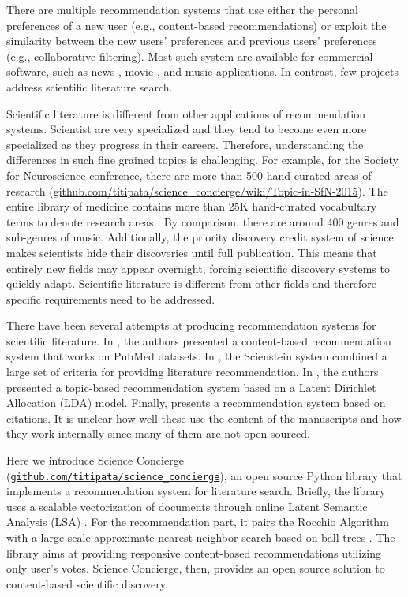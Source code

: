 \documentclass[a4paper]{article}
\begin{document}
There are multiple recommendation systems that use either the personal preferences of a new user (e.g., content-based recommendations) or exploit the similarity between the new users’ preferences and previous users’ preferences (e.g., collaborative filtering). Most such system are available for commercial software, such as news \cite{li2010contextual}, movie \cite{bell2007lessons}, and music \cite{Ali11parallelcollaborative} applications. In contrast, few projects address scientific literature search.

Scientific literature is different from other applications of recommendation systems.
Scientist are very specialized and they tend to become even more specialized
as they progress in their careers. Therefore, understanding the differences in such
fine grained topics is challenging. For example, for the Society for Neuroscience
conference, there are more than 500 hand-curated areas of research (\url{github.com/titipata/science_concierge/wiki/Topic-in-SfN-2015}). The entire
library of medicine contains more than 25K hand-curated vocabultary terms to denote research areas \cite{lipscomb2000medical}. By comparison, there are around 400 genres and sub-genres of music.
Additionally, the priority discovery credit system of science makes scientists hide their discoveries until full publication.
This means that entirely new fields may appear overnight, forcing scientific discovery systems
to quickly adapt. Scientific literature is different from other fields and therefore
specific requirements need to be addressed.


There have been several attempts at producing recommendation systems for scientific literature.
In \cite{yoneya2007pure}, the authors presented a content-based recommendation system that works on PubMed datasets. In \cite{gipp2009scienstein}, the Scienstein system combined a large set of criteria for providing literature recommendation. In \cite{wang2011collaborative}, the authors presented a topic-based recommendation system based on a Latent Dirichlet Allocation (LDA) model. Finally, \cite{wesley2016babel} presents a recommendation system based on citations. It is unclear how well these use the content of the
manuscripts and how they work internally since many of them are not open sourced.


Here we introduce Science Concierge (\href{https://github.com/titipata/science_concierge}{\texttt{github.com/titipata/science\_concierge}}), an open source Python library that implements a recommendation system for literature search. Briefly, the library uses a scalable vectorization of documents through online Latent Semantic Analysis (LSA) \cite{manning2008introduction}. For the recommendation part, it pairs the Rocchio Algorithm \cite{rocchio1971relevance} with a large-scale approximate nearest neighbor search based on ball trees \cite{shakhnarovish2005indyk}. The library aims at providing responsive content-based recommendations utilizing only user’s votes. Science Concierge, then, provides an open source solution to content-based scientific discovery.
\end{document}
